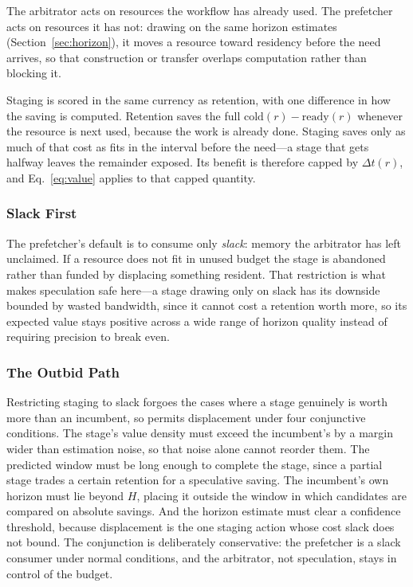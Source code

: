The arbitrator acts on resources the workflow has already used. The prefetcher
acts on resources it has not: drawing on the same horizon estimates
(Section~\ref{sec:horizon}), it moves a resource toward residency before the
need arrives, so that construction or transfer overlaps computation rather
than blocking it.

Staging is scored in the same currency as retention, with one difference in
how the saving is computed. Retention saves the full $\mathrm{cold}(r) -
\mathrm{ready}(r)$ whenever the resource is next used, because the work is
already done. Staging saves only as much of that cost as fits in the interval
before the need---a stage that gets halfway leaves the remainder exposed. Its
benefit is therefore capped by $\Delta t(r)$, and Eq.~\ref{eq:value} applies
to that capped quantity.

\subsubsection{Slack First}

The prefetcher's default is to consume only \emph{slack}: memory the
arbitrator has left unclaimed. If a resource does not fit in unused budget the
stage is abandoned rather than funded by displacing something resident. That
restriction is what makes speculation safe here---a stage drawing only on
slack has its downside bounded by wasted bandwidth, since it cannot cost a
retention worth more, so its expected value stays positive across a wide range
of horizon quality instead of requiring precision to break even.

\subsubsection{The Outbid Path}


Restricting staging to slack forgoes the cases where a stage genuinely is
worth more than an incumbent, so \sysname{} permits displacement under four
conjunctive conditions. The stage's value density must exceed the incumbent's
by a margin wider than estimation noise, so that noise alone cannot reorder
them. The predicted window must be long enough to complete the stage, since a
partial stage trades a certain retention for a speculative saving. The
incumbent's own horizon must lie beyond $H$, placing it outside the window in
which candidates are compared on absolute savings. And the horizon estimate
must clear a confidence threshold, because displacement is the one staging
action whose cost slack does not bound. The conjunction is deliberately
conservative: the prefetcher is a slack consumer under normal conditions, and
the arbitrator, not speculation, stays in control of the budget.
